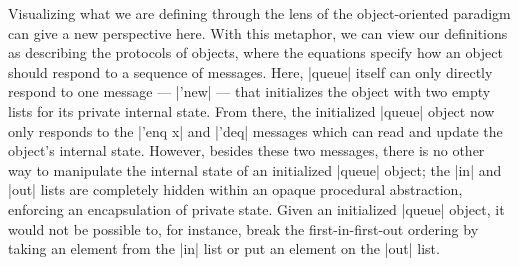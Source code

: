 Visualizing what we are defining through the lens of the object-oriented paradigm can give a new perspective here.
With this metaphor, we can view our definitions as describing the protocols of objects, where the equations specify how an object should respond to a sequence of messages.
Here, \scm|queue| itself can only directly respond to one message --- \scm|'new| --- that initializes the object with two empty lists for its private internal state.
From there, the initialized \scm|queue| object now only responds to the \scm|'enq x| and \scm|'deq| messages which can read and update the object's internal state.
However, besides these two messages, there is no other way to manipulate the internal state of an initialized \scm|queue| object;
the \scm|in| and \scm|out| lists are completely hidden within an opaque procedural abstraction, enforcing an encapsulation of private state.
Given an initialized \scm|queue| object, it would not be possible to, for instance, break the first-in-first-out ordering by taking an element from the \scm|in| list or put an element on the \scm|out| list.

